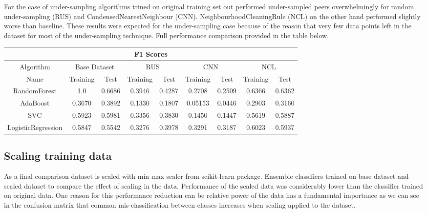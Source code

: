 \documentclass[12pt]{article}
\begin{document}
For the case of under-sampling algorithms trined on original training set out performed under-sampled peers overwhelmingly for random under-sampling (RUS) and CondensedNearestNeighbour (CNN). NeighbourhoodCleaningRule (NCL) on the other hand performed slightly worse than baseline. These results were expected for the under-sampling case because of the reason that very few data points left in the dataset for most of the under-sampling technique. Full performance comparison provided in the table below.

\begin{center}
    \begin{tabular}{||c c c c c c c c c||} 
    \hline
    \multicolumn{9}{||c||}{F1 Scores} \\
    \hline
    Algorithm & \multicolumn{2}{c}{Base Dataset} & \multicolumn{2}{c}{RUS} & \multicolumn{2}{c}{CNN} & \multicolumn{2}{c||}{NCL}\\
    Name & Training & Test & Training & Test & Training & Test & Training & Test\\ [0.5ex] 
    \hline\hline
    RandomForest & 1.0 & 0.6686 & 0.3946 & 0.4287 & 0.2708 & 0.2509 & 0.6366 & 0.6362\\ 
    \hline
    AdaBoost & 0.3670 & 0.3892 & 0.1330 & 0.1807 & 0.05153 & 0.0446 & 0.2903 & 0.3160\\ 
    \hline
    SVC & 0.5923 & 0.5981 & 0.3356 & 0.3830 & 0.1450 & 0.1447 & 0.5619 & 0.5887\\ 
    \hline
    LogisticRegression & 0.5847 & 0.5542 & 0.3276 & 0.3978 & 0.3291 & 0.3187 & 0.6023 & 0.5937\\ [1ex] 
    \hline
   \end{tabular}
\end{center}

\subsection{Scaling training data} \label{subse:scalingdata}

As a final comparison dataset is scaled with min max scaler from scikit-learn \cite{scikit-learn} package. Ensemble classifiers trained on base dataset and scaled dataset to compare the effect of scaling in the data. Performance of the scaled data was considerably lower than the classifier trained on original data. One reason for this performance reduction can be relative power of the data has a fundamental importance as we can see in the confusion matrix that common mis-classification between classes increases when scaling applied to the dataset.
\end{document}
